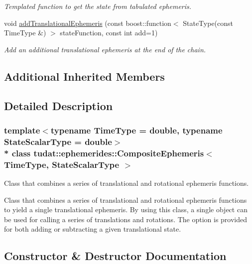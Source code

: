 \begin{DoxyCompactItemize}
\begin{DoxyCompactList}\small\item\em Templated function to get the state from tabulated ephemeris. \end{DoxyCompactList}\item 
void \hyperlink{classtudat_1_1ephemerides_1_1CompositeEphemeris_a63a15a826c28ae2c98336f844d1f0a39}{add\+Translational\+Ephemeris} (const boost\+::function$<$ State\+Type(const Time\+Type \&) $>$ state\+Function, const int add=1)
\begin{DoxyCompactList}\small\item\em Add an additional translational ephemeris at the end of the chain. \end{DoxyCompactList}\end{DoxyCompactItemize}
\subsection*{Additional Inherited Members}


\subsection{Detailed Description}
\subsubsection*{template$<$typename Time\+Type = double, typename State\+Scalar\+Type = double$>$\\*
class tudat\+::ephemerides\+::\+Composite\+Ephemeris$<$ Time\+Type, State\+Scalar\+Type $>$}

Class that combines a series of translational and rotational ephemeris functions. 

Class that combines a series of translational and rotational ephemeris functions to yield a single translational ephemeris. By using this class, a single object can be used for calling a series of translations and rotations. The option is provided for both adding or subtracting a given translational state. 

\subsection{Constructor \& Destructor Documentation}
